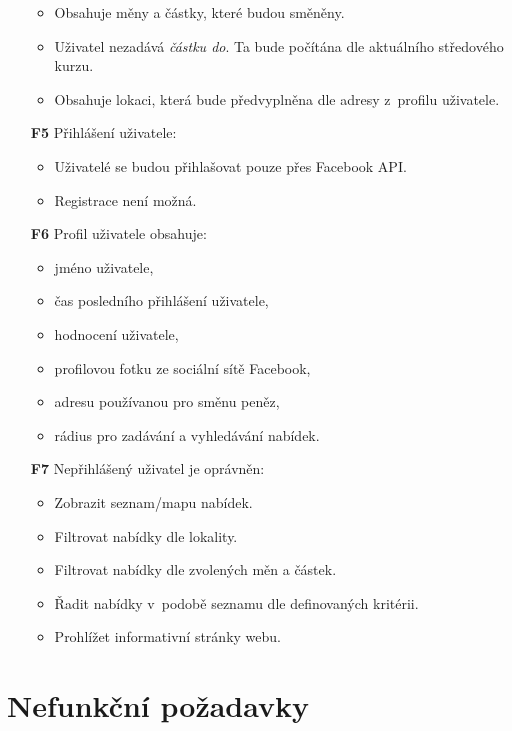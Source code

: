 \begin{itemize}
        \begin{itemize}
            \item Obsahuje měny a částky, které budou směněny.
            \item Uživatel nezadává \textit{částku do}. Ta bude počítána dle aktuálního středového kurzu.
            \item Obsahuje lokaci, která bude předvyplněna dle adresy z~profilu uživatele.
        \end{itemize}
    \item[\textbf{F5}] Přihlášení uživatele:
        \begin{itemize}
            \item Uživatelé se budou přihlašovat pouze přes Facebook API.
            \item Registrace není možná.
        \end{itemize}
    \item[\textbf{F6}] Profil uživatele obsahuje:
        \begin{itemize}
            \item jméno uživatele,
            \item čas posledního přihlášení uživatele,
            \item hodnocení uživatele,
            \item profilovou fotku ze sociální sítě Facebook,
            \item adresu používanou pro směnu peněz,
            \item rádius pro zadávání a vyhledávání nabídek.
        \end{itemize}
    \item[\textbf{F7}] Nepřihlášený uživatel je oprávněn:
        \begin{itemize}
            \item Zobrazit seznam/mapu nabídek.
            \item Filtrovat nabídky dle lokality.
            \item Filtrovat nabídky dle zvolených měn a částek.
            \item Řadit nabídky v~podobě seznamu dle definovaných kritérii.
            \item Prohlížet informativní stránky webu.
        \end{itemize}
\end{itemize}


\section{Nefunkční požadavky}


